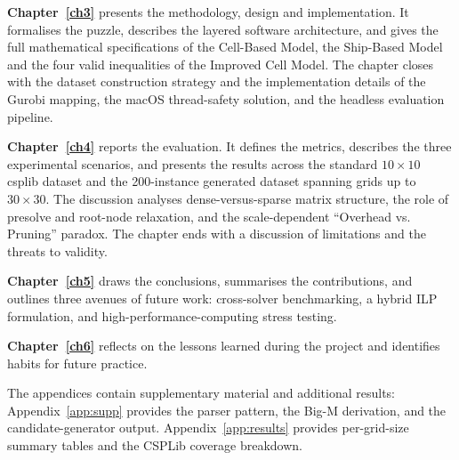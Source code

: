 \textbf{Chapter~\ref{ch3}} presents the methodology, design and implementation. It formalises the puzzle, describes the layered software architecture, and gives the full mathematical specifications of the Cell-Based Model, the Ship-Based Model and the four valid inequalities of the Improved Cell Model. The chapter closes with the dataset construction strategy and the implementation details of the Gurobi mapping, the macOS thread-safety solution, and the headless evaluation pipeline.

\textbf{Chapter~\ref{ch4}} reports the evaluation. It defines the metrics, describes the three experimental scenarios, and presents the results across the standard $10 \times 10$ \gls{csplib} dataset and the \num{200}-instance generated dataset spanning grids up to $30 \times 30$. The discussion analyses dense-versus-sparse matrix structure, the role of presolve and root-node relaxation, and the scale-dependent ``Overhead vs. Pruning'' paradox. The chapter ends with a discussion of limitations and the threats to validity.

\textbf{Chapter~\ref{ch5}} draws the conclusions, summarises the contributions, and outlines three avenues of future work: cross-solver benchmarking, a hybrid ILP formulation, and high-performance-computing stress testing.

\textbf{Chapter~\ref{ch6}} reflects on the lessons learned during the project and identifies habits for future practice.

The appendices contain supplementary material and additional results: Appendix~\ref{app:supp} provides the parser pattern, the Big-M derivation, and the candidate-generator output. Appendix~\ref{app:results} provides per-grid-size summary tables and the CSPLib coverage breakdown.



